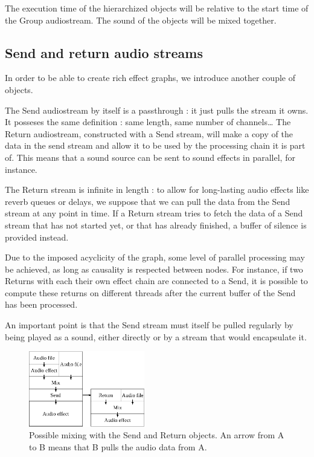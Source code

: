 \documentclass{article}
\begin{document}
The execution time of the hierarchized objects will be relative to the start time of the Group audiostream.
The sound of the objects will be mixed together.

\subsection{Send and return audio streams}
In order to be able to create rich effect graphs, we introduce another couple of objects.

The Send audiostream by itself is a passthrough : it just pulls the stream it owns.
It posseses the same definition : same length, same number of channels\dots
The Return audiostream, constructed with a Send stream, will make a copy of the data in 
the send stream and allow it to be used by the processing chain it is part of.
This means that a sound source can be sent to sound effects in parallel, for instance.

The Return stream is infinite in length : to allow for long-lasting audio effects 
like reverb queues or delays, we suppose that we can pull the data from the Send stream at any point in time.
If a Return stream tries to fetch the data of a Send stream that has not started yet, or that has already finished, a buffer of silence is provided instead.

Due to the imposed acyclicity of the graph, some level of parallel processing may be achieved, 
as long as causality is respected between nodes. 
For instance, if two Returns with each their own effect chain are connected to a Send, it is possible 
to compute these returns on different threads after the current buffer of the Send has been processed.

An important point is that the Send stream must itself be pulled regularly by being played as a sound, either directly or by a stream that would encapsulate it.

\begin{figure}
	\includegraphics[width=0.45\textwidth]{figures/graph2.eps}
	\caption{Possible mixing with the Send and Return objects. An arrow from A to B means that B pulls the audio data from A.}
\end{figure}
\end{document}
